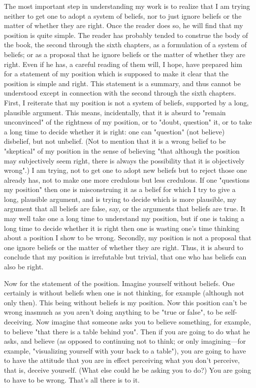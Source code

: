 \documentclass[10pt,twoside,draft]{memoir}
\begin{document}
{The most important step in understanding my work is to realize that I 
am trying neither to get one to adopt a system of beliefs, nor to just ignore 
beliefs or the matter of whether they are right. Once the reader does so, he 
will find that my position is quite simple. The reader has probably tended to 
construe the body of the book, the second through the sixth chapters, as a 
formulation of a system of beliefs; or as a proposal that he ignore beliefs or 
the matter of whether they are right. Even if he has, a careful reading of 
them will, I hope, have prepared him for a statement of my position which is 
supposed to make it clear that the position is simple and right. This 
statement is a summary, and thus cannot be understood except in 
connection with the second through the sixth chapters. First, I reiterate that 
my position is not a system of beliefs, supported by a long, plausible 
argument. This means, incidentally, that it is absurd to "remain 
unconvinced" of the rightness of my position, or to "doubt, question" it, or 
to take a long time to decide whether it is right: one can "question" (not 
believe) disbelief, but not unbelief. (Not to mention that it is a wrong belief 
to be "skeptical" of my position in the sense of believing "that although the 
position may subjectively seem right, there is always the possibility that it is 
objectively wrong".) I am trying, not to get one to adopt new beliefs but to 
reject those one already has, not to make one more credulous but less 
credulous. If one "questions my position" then one is misconstruing it as a 
belief for which I try to give a long, plausible argument, and is trying to 
decide which is more plausible, my argument that all beliefs are false, say, or 
the arguments that beliefs are true. It may well take one a long time to 
understand my position, but if one is taking a long time to decide whether it 
is right then one is wasting one's time thinking about a position I show to be 
wrong. Secondly, my position is not a proposal that one ignore beliefs or the 
matter of whether they are right. Thus, it is absurd to conclude that my 
position is irrefutable but trivial, that one who has beliefs can also be right. 

Now for the statement of the position. Imagine yourself without 
beliefs. One certainly is without beliefs when one is not thinking, for 
example (although not only then). This being without beliefs is my position. 
Now this position can't be wrong inasmuch as you aren't doing anything to 
be "true or false", to be self-deceiving. Now imagine that someone asks you 
to believe something, for example, to believe "that there is a table behind 
you". Then if you are going to do what he asks, and believe (as opposed to 
continuing not to think; or only imagining---for example, "visualizing 
yourself with your back to a table"), you are going to have to have the 
attitude that you are in effect perceiving what you don't perceive, that is, 
deceive yourself. (What else could he be asking you to do?) You are going 
to have to be wrong. That's all there is to it. 

}
\end{document}
